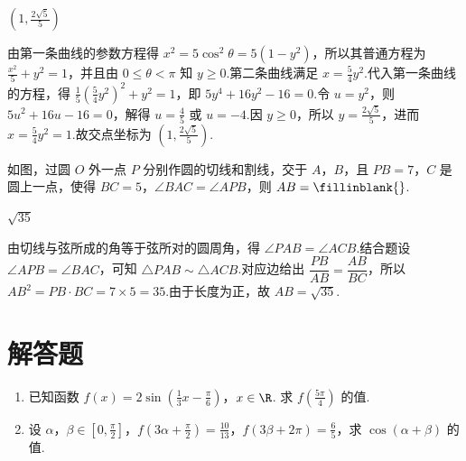 \begin{answer}
\(\left(1,\frac{2\sqrt{5}}{5}\right)\)
\end{answer}

\begin{solution}
由第一条曲线的参数方程得 \(x^2=5\cos^2\theta=5(1-y^2)\)，所以其普通方程为 \(\frac{x^2}{5}+y^2=1\)，并且由 \(0\leqslant\theta<\pi\) 知 \(y\geqslant0\).第二条曲线满足 \(x=\frac54y^2\).代入第一条曲线的方程，得 \(\frac{1}{5}\left(\frac54y^2\right)^2+y^2=1\)，即 \(5y^4+16y^2-16=0\).令 \(u=y^2\)，则 \(5u^2+16u-16=0\)，解得 \(u=\frac45\) 或 \(u=-4\).因 \(y\geqslant0\)，所以 \(y=\frac{2\sqrt{5}}{5}\)，进而 \(x=\frac54y^2=1\).故交点坐标为 \(\left(1,\frac{2\sqrt{5}}{5}\right)\).
\end{solution}

\begin{problem}
如图，过圆 \(O\) 外一点 \(P\) 分别作圆的切线和割线，交于 \(A\)，\(B\)，且 \(PB = 7\)，\(C\) 是圆上一点，使得 \(BC = 5\)，\(\angle BAC = \angle APB\)，则 \(AB =\fillinblank{}\).

\end{problem}

\begin{answer}
\(\sqrt{35}\)
\end{answer}

\begin{solution}
由切线与弦所成的角等于弦所对的圆周角，得 \(\angle PAB=\angle ACB\).结合题设 \(\angle APB=\angle BAC\)，可知 \(\triangle PAB\sim\triangle ACB\).对应边给出 \(\dfrac{PB}{AB}=\dfrac{AB}{BC}\)，所以 \(AB^2=PB\cdot BC=7\times5=35\).由于长度为正，故 \(AB=\sqrt{35}\).
\end{solution}

\section{解答题}

\begin{problem}
\begin{enumerate}
\item 已知函数 \(f(x) = 2\sin \left(\frac{1}{3} x - \frac{\pi}{6}\right)\)，\(x \in \R\). 求 \( f\left(\frac{5\pi}{4}\right) \) 的值.
\item 设 \(\alpha\)，\(\beta \in \left[0, \frac{\pi}{2}\right]\)，\(f\left(3\alpha + \frac{\pi}{2}\right) = \frac{10}{13}\)，\(f(3\beta + 2\pi) = \frac{6}{5}\)，求 \(\cos (\alpha + \beta)\) 的值.
\end{enumerate}
\end{problem}

